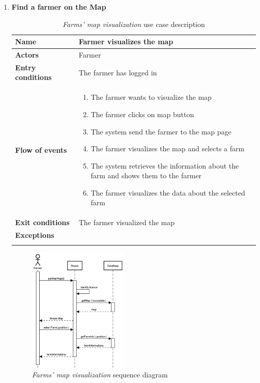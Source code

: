 \begin{enumerate}
    \item \textbf{Find a farmer on the Map}
    \begin{longtable}{p{0.26\linewidth}p{0.75\linewidth}}
        \toprule
        \textbf{Name} & \textbf{Farmer visualizes the map} \\
        \midrule
        \textbf{Actors} & Farmer \\
        \midrule
        \textbf{Entry conditions} & The farmer has logged in\\
        \midrule
        \textbf{Flow of events} & 
        \begin{enumerate}
            \item The farmer wants to visualize the map
            \item The farmer clicks on map button
            \item The system send the farmer to the map page
            \item The farmer visualizes the map and selects a farm
            \item The system retrieves the information about the farm and shows them to the farmer
            \item The farmer visualizes the data about the selected farm
        \end{enumerate} \\
        \midrule
        \textbf{Exit conditions} & The farmer visualized the map\\
        \midrule
        \textbf{Exceptions} & \\
        \bottomrule
        \caption{\emph{Farms' map visualization} use case description}
    \end{longtable}
    \begin{figure}[H]
        \begin{center}
        \includegraphics[width=0.45\textwidth]{sequence/VisializeMap.png}
        \caption{\emph{Farms' map visualization} sequence diagram}
        \label{fig:sequence5}
        \end{center}
    \end{figure}
    

\end{enumerate}

